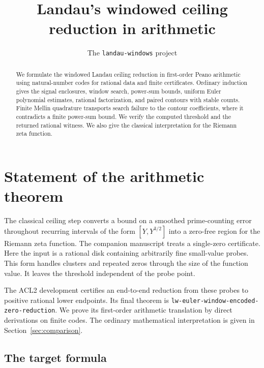 \documentclass[11pt]{amsart}
\theoremstyle{definition}
\theoremstyle{remark}
\numberwithin{equation}{section}
\newcommand{\code}[1]{\nolinkurl{#1}}
\begin{document}
\title[The windowed Landau reduction in arithmetic]
  {Landau's windowed ceiling reduction in arithmetic}
\author{The \texttt{landau-windows} project}
\begin{abstract}
We formulate the windowed Landau ceiling reduction in first-order
Peano arithmetic using natural-number codes for rational data and
finite certificates. Ordinary induction gives the signal enclosures,
window search, power-sum bounds, uniform Euler polynomial estimates,
rational factorization, and paired contours with stable counts.
Finite Mellin quadrature transports search failure to the contour
coefficients, where it contradicts a finite power-sum bound.
We verify the computed threshold and the returned rational witness.
We also give the classical interpretation for the Riemann zeta
function.
\end{abstract}
\maketitle
\tableofcontents
\clearpage

\section{Statement of the arithmetic theorem}

The classical ceiling step converts a bound on a smoothed prime-counting
error throughout recurring intervals of the form $[Y,Y^{3/2}]$ into a
zero-free region for the Riemann zeta function. The companion manuscript
\cite{companion} treats a single-zero certificate. Here the input is
a rational disk containing arbitrarily fine small-value probes. This
form handles clusters and repeated zeros through the size of the
function value. It leaves the threshold independent of the probe
point.

The ACL2 development certifies an end-to-end reduction from these probes
to positive rational lower endpoints. Its final theorem is
\code{lw-euler-window-encoded-zero-reduction}. We prove its first-order
arithmetic translation by direct derivations on finite codes.
The ordinary mathematical interpretation is given in
Section~\ref{sec:comparison}.

\subsection{The target formula}
\end{document}
